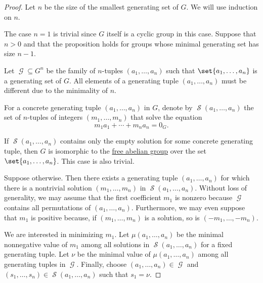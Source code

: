\begin{proof}
  Let \( n \) be the size of the smallest generating set of \( G \). We will use induction on \( n \).

  The case \( n = 1 \) is trivial since \( G \) itself is a cyclic group in this case. Suppose that \( n > 0 \) and that the proposition holds for groups whose minimal generating set has size \( n - 1 \).

  Let \( \mscrG \subseteq G^n \) be the family of \( n \)-tuples \( (a_1, \ldots, a_n) \) such that \( \set{ a_1, \ldots, a_n } \) is a generating set of \( G \). All elements of a generating tuple \( (a_1, \ldots, a_n) \) must be different due to the minimality of \( n \).

  For a concrete generating tuple \( (a_1, \ldots, a_n) \) in \( G \), denote by \( \mscrS(a_1, \ldots, a_n) \) the set of \( n \)-tuples of integers \( (m_1, \ldots, m_n) \) that solve the equation
  \begin{equation}\label{eq:thm:fundamental_theorem_of_finitely_generated_abelian_groups/proof/equation_general}
    m_1 a_1 + \cdots + m_n a_n = 0_G.
  \end{equation}

  If \( \mscrS(a_1, \ldots, a_n) \) contains only the empty solution for some concrete generating tuple, then \( G \) is isomorphic to the \hyperref[def:free_abelian_group]{free abelian group} over the set \( \set{ a_1, \ldots, a_n } \). This case is also trivial.

  Suppose otherwise. Then there exists a generating tuple \( (a_1, \ldots, a_n) \) for which there is a nontrivial solution \( (m_1, \ldots, m_n) \) in \( \mscrS(a_1, \ldots, a_n) \). Without loss of generality, we may assume that the first coefficient \( m_1 \) is nonzero because \( \mscrG \) contains all permutations of \( (a_1, \ldots, a_n) \). Furthermore, we may even suppose that \( m_1 \) is positive because, if \( (m_1, \ldots, m_n) \) is a solution, so is \( (-m_1, \ldots, -m_n) \).

  We are interested in minimizing \( m_1 \). Let \( \mu(a_1, \ldots, a_n) \) be the minimal nonnegative value of \( m_1 \) among all solutions in \( \mscrS(a_1, \ldots, a_n) \) for a fixed generating tuple. Let \( \nu \) be the minimal  value of \( \mu(a_1, \ldots, a_n) \) among all generating tuples in \( \mscrG \). Finally, choose \( (a_1, \ldots, a_n) \in \mscrG \) and \( (s_1, \ldots, s_n) \in \mscrS(a_1, \ldots, a_n) \) such that \( s_1 = \nu \).


\end{proof}
